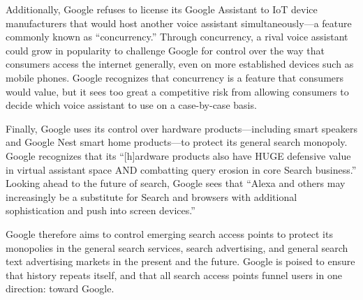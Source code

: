 \documentclass[11pt,b5paper,headings=small]{scrartcl}
\begin{document}

Additionally, Google refuses to license its Google Assistant to IoT device
manufacturers that would host another voice assistant simultaneously—a feature commonly
known as “concurrency.” Through concurrency, a rival voice assistant could grow in popularity
to challenge Google for control over the way that consumers access the internet generally, even
on more established devices such as mobile phones. Google recognizes that concurrency is a
feature that consumers would value, but it sees too great a competitive risk from allowing
consumers to decide which voice assistant to use on a case-by-case basis.


Finally, Google uses its control over hardware products—including smart
speakers and Google Nest smart home products—to protect its general search monopoly. Google
recognizes that its “[h]ardware products also have HUGE defensive value in virtual assistant
space AND combatting query erosion in core Search business.” Looking ahead to the future of
search, Google sees that “Alexa and others may increasingly be a substitute for Search and
browsers with additional sophistication and push into screen devices.”


Google therefore aims to control emerging search access points to protect its
monopolies in the general search services, search advertising, and general search text advertising
markets in the present and the future. Google is poised to ensure that history repeats itself, and
that all search access points funnel users in one direction: toward Google.



\end{document}
